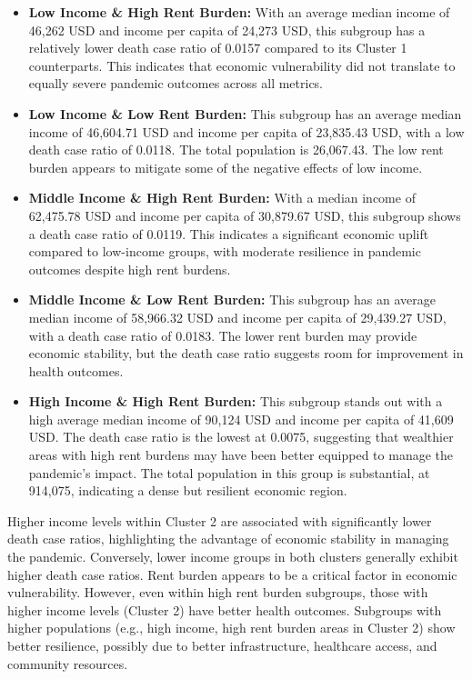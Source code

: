 \documentclass[
]{article}
\providecommand{\tightlist}{%
  \setlength{\itemsep}{0pt}\setlength{\parskip}{0pt}}
\begin{document}
\begin{itemize}
\tightlist
\item
  \textbf{Low Income \& High Rent Burden:} With an average median income
  of 46,262 USD and income per capita of 24,273 USD, this subgroup has a
  relatively lower death case ratio of 0.0157 compared to its Cluster 1
  counterparts. This indicates that economic vulnerability did not
  translate to equally severe pandemic outcomes across all metrics.
\item
  \textbf{Low Income \& Low Rent Burden:} This subgroup has an average
  median income of 46,604.71 USD and income per capita of 23,835.43 USD,
  with a low death case ratio of 0.0118. The total population is
  26,067.43. The low rent burden appears to mitigate some of the
  negative effects of low income.
\item
  \textbf{Middle Income \& High Rent Burden:} With a median income of
  62,475.78 USD and income per capita of 30,879.67 USD, this subgroup
  shows a death case ratio of 0.0119. This indicates a significant
  economic uplift compared to low-income groups, with moderate
  resilience in pandemic outcomes despite high rent burdens.
\item
  \textbf{Middle Income \& Low Rent Burden:} This subgroup has an
  average median income of 58,966.32 USD and income per capita of
  29,439.27 USD, with a death case ratio of 0.0183. The lower rent
  burden may provide economic stability, but the death case ratio
  suggests room for improvement in health outcomes.
\item
  \textbf{High Income \& High Rent Burden:} This subgroup stands out
  with a high average median income of 90,124 USD and income per capita
  of 41,609 USD. The death case ratio is the lowest at 0.0075,
  suggesting that wealthier areas with high rent burdens may have been
  better equipped to manage the pandemic's impact. The total population
  in this group is substantial, at 914,075, indicating a dense but
  resilient economic region.
\end{itemize}

\vspace{5pt}

Higher income levels within Cluster 2 are associated with significantly
lower death case ratios, highlighting the advantage of economic
stability in managing the pandemic. Conversely, lower income groups in
both clusters generally exhibit higher death case ratios. Rent burden
appears to be a critical factor in economic vulnerability. However, even
within high rent burden subgroups, those with higher income levels
(Cluster 2) have better health outcomes. Subgroups with higher
populations (e.g., high income, high rent burden areas in Cluster 2)
show better resilience, possibly due to better infrastructure,
healthcare access, and community resources.
\end{document}
